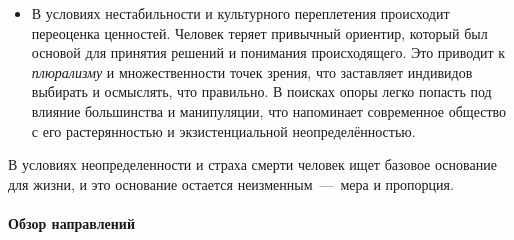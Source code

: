 \begin{itemize}

\item В условиях нестабильности и культурного переплетения происходит переоценка ценностей. Человек теряет привычный ориентир, который был основой для принятия решений и понимания происходящего. Это приводит к \textit{плюрализму} и множественности точек зрения, что заставляет индивидов выбирать и осмыслять, что правильно. В поисках опоры легко попасть под влияние большинства и манипуляции, что напоминает современное общество с его растерянностью и экзистенциальной неопределённостью.
\end{itemize}

В условиях неопределенности и страха смерти человек ищет базовое основание для жизни, и это основание остается неизменным~---~мера и пропорция.


\paragraph{Обзор направлений}



